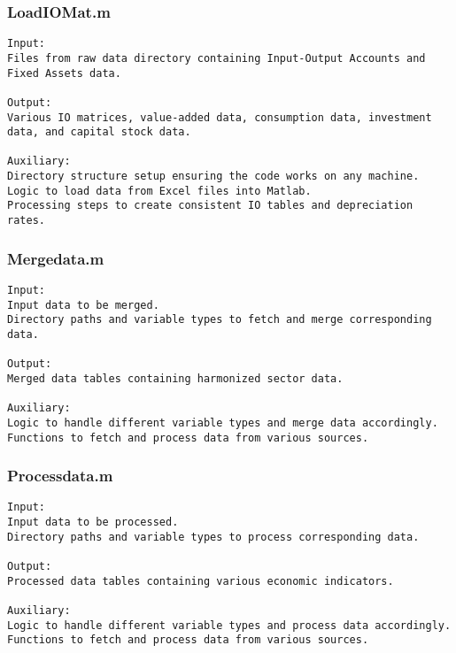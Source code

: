 \documentclass[11pt]{article}
\theoremstyle{definition}
\newcommand{\codepath}{F:/12004835/replication_package_final/replication_package_final}
\begin{document}
	\subsubsection{LoadIOMat.m}
	\begin{lstlisting}[style=Matlab]
Input:
Files from raw data directory containing Input-Output Accounts and Fixed Assets data.

Output:
Various IO matrices, value-added data, consumption data, investment data, and capital stock data.

Auxiliary:
Directory structure setup ensuring the code works on any machine.
Logic to load data from Excel files into Matlab.
Processing steps to create consistent IO tables and depreciation rates.
	\end{lstlisting}
	
	
	
	\subsubsection{Mergedata.m}
	\begin{lstlisting}[style=Matlab]
Input:
Input data to be merged.
Directory paths and variable types to fetch and merge corresponding data.

Output:
Merged data tables containing harmonized sector data.

Auxiliary:
Logic to handle different variable types and merge data accordingly.
Functions to fetch and process data from various sources.	
	\end{lstlisting}
	
	
	
	\subsubsection{Processdata.m}
	\begin{lstlisting}[style=Matlab]
Input:
Input data to be processed.
Directory paths and variable types to process corresponding data.

Output:
Processed data tables containing various economic indicators.

Auxiliary:
Logic to handle different variable types and process data accordingly.
Functions to fetch and process data from various sources.
	\end{lstlisting}
	
	
\end{document}
